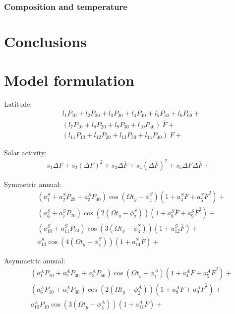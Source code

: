 \documentclass[referee,a4paper,12pt,traditabstract]{swsc}
\begin{document}
\begin{linenumbers}
\subsubsection{Composition and temperature}





\section{Conclusions}





\begin{acknowledgements}

\end{acknowledgements}

\appendix
\section{Model formulation}

Latitude:
\begin{align*}
& l_1 P_{10} + l_2 P_{20} + l_3 P_{30} + l_4 P_{40} + l_5 P_{50} + l_6 P_{60} + \\
& (l_7 P_{10} + l_8 P_{20} + l_9 P_{30} + l_{10} P_{40})~\overline{F} + \\
& (l_{11} P_{10} + l_{12} P_{20} + l_{13} P_{30} + l_{14} P_{40})~F +
\end{align*}

Solar activity:
\begin{align*}
s_1 \Delta F + s_2 (\Delta F)^2 + s_3 \Delta \overline{F} + s_4 (\Delta \overline{F})^2 + s_5 \Delta F \Delta \overline{F} +
\end{align*}

Symmetric annual:
\begin{align*}
&(a^S_1 + a^S_2 P_{20} + a^S_3P_{40})\cos(\Omega t_y-\phi^S_1)(1+a^S_4\overline{F}+ a^S_5\overline{F}^2) +\\
&(a^S_6 + a^S_7 P_{20})\cos(2(\Omega t_y-\phi^S_2))(1+a^S_8\overline{F}+ a^S_9\overline{F}^2) +\\
&(a^S_{10} + a^S_{11} P_{20})\cos(3(\Omega t_y-\phi^S_3))(1+a^S_{12}\overline{F})+\\
&a^S_{13}\cos(4(\Omega t_y-\phi^S_4))(1+a^S_{14}\overline{F})+
\end{align*}

Asymmetric annual:
\begin{align*}
&(a^A_1P_{10}+a^A_2P_{30}+a^A_3 P_{50})\cos(\Omega t_y-\phi^A_1)(1+a^A_4\overline{F}+a^A_5\overline{F}^2)+\\
&(a^A_6P_{10}+a^A_7P_{30})\cos(2(\Omega t_y-\phi^A_2))(1+a^A_8\overline{F}+a^A_9\overline{F}^2) + \\
&a^A_{10} P_{10}\cos(3(\Omega t_y-\phi^A_3))(1+a^A_{11}\overline{F})+
\end{align*}


\end{linenumbers}
\end{document}

